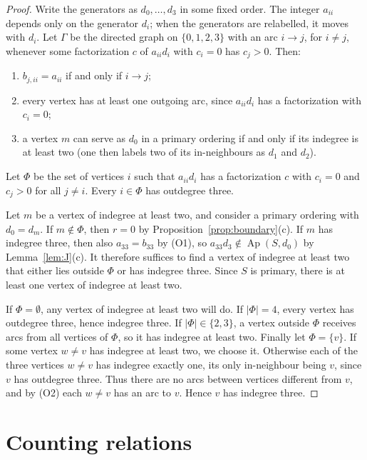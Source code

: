 \documentclass{amsart}
\theoremstyle{definition}
\theoremstyle{remark}
\numberwithin{equation}{section}
\newcommand{\Ap}{\operatorname{Ap}}
\newcommand{\Apd}{\Ap(S,d_0)}
\begin{document}
\begin{proof}
Write the generators as $d_0,\dots,d_3$ in some fixed order. The integer $a_{ii}$ depends only on the generator $d_i$; when the generators are relabelled, it moves with $d_i$. Let $\Gamma$ be the directed graph on $\{0,1,2,3\}$ with an arc $i\to j$, for $i\neq j$, whenever some factorization $c$ of $a_{ii}d_i$ with $c_i=0$ has $c_j>0$. Then:
\begin{enumerate}[(O1)]
\item $b_{j,ii}=a_{ii}$ if and only if $i\to j$;
\item every vertex has at least one outgoing arc, since $a_{ii}d_i$ has a factorization with $c_i=0$;
\item a vertex $m$ can serve as $d_0$ in a primary ordering if and only if its indegree is at least two (one then labels two of its in-neighbours as $d_1$ and $d_2$).
\end{enumerate}
Let $\Phi$ be the set of vertices $i$ such that $a_{ii}d_i$ has a factorization $c$ with $c_i=0$ and $c_j>0$ for all $j\neq i$. Every $i\in\Phi$ has outdegree three.

Let $m$ be a vertex of indegree at least two, and consider a primary ordering with $d_0=d_m$. If $m\notin\Phi$, then $r=0$ by Proposition~\ref{prop:boundary}(c). If $m$ has indegree three, then also $a_{33}=b_{33}$ by (O1), so $a_{33}d_3\notin\Apd$ by Lemma~\ref{lem:J}(c). It therefore suffices to find a vertex of indegree at least two that either lies outside $\Phi$ or has indegree three. Since $S$ is primary, there is at least one vertex of indegree at least two.

If $\Phi=\emptyset$, any vertex of indegree at least two will do. If $|\Phi|=4$, every vertex has outdegree three, hence indegree three. If $|\Phi|\in\{2,3\}$, a vertex outside $\Phi$ receives arcs from all vertices of $\Phi$, so it has indegree at least two. Finally let $\Phi=\{v\}$. If some vertex $w\neq v$ has indegree at least two, we choose it. Otherwise each of the three vertices $w\neq v$ has indegree exactly one, its only in-neighbour being $v$, since $v$ has outdegree three. Thus there are no arcs between vertices different from $v$, and by (O2) each $w\neq v$ has an arc to $v$. Hence $v$ has indegree three.
\end{proof}

\section{Counting relations}\label{sec:relations}
\end{document}
